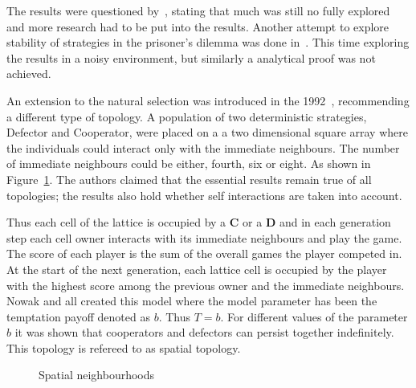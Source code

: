 \documentclass{article}
\begin{document}
The results were questioned by~\cite{May1987}, stating that much was
still no fully explored and more research had to be put into the results.
Another attempt to explore stability of strategies in the prisoner's dilemma
was done in~\cite{Boyd1989}. This time exploring the results in a noisy
environment, but similarly a analytical proof was not achieved.

An extension to the natural selection was introduced in the 1992~\cite{Nowak1992b},
recommending a different type of topology. A population of two deterministic
strategies, Defector and Cooperator, were placed on a a two dimensional square array
where the individuals could interact only with the immediate neighbours.
The number of immediate neighbours could be either, fourth, six or eight. As
shown in Figure~\ref{fig:topologies}. The authors claimed that the essential
results remain true of all topologies; the results also hold whether self interactions
are taken into account.

Thus each cell of the lattice is occupied by a \textbf{C} or a \textbf{D} and in
each generation step each cell owner interacts with its immediate neighbours and
play the game. The score of each player is the sum of the overall games the player
competed in. At the start of the next generation, each lattice cell is occupied by the
player with the highest score among the previous owner and the immediate
neighbours. Nowak and all created this model where the model parameter
has been the temptation payoff denoted as \(b\). Thus \(T=b\). For 
different values of the parameter \(b\) it was shown that cooperators and
defectors can persist together indefinitely. This topology is refereed to as
spatial topology.

\begin{figure}[!hbtp]
\centering
    \begin{subfigure}{.25\textwidth}
            
    \end{subfigure}
    \begin{subfigure}{.25\textwidth}\centering
         
     \end{subfigure}
     \begin{subfigure}{.25\textwidth}\centering
         
     \end{subfigure}
    \begin{subfigure}{.25\textwidth}
            
    \end{subfigure}
    \begin{subfigure}{.25\textwidth}\centering
         
     \end{subfigure}
     \begin{subfigure}{.25\textwidth}\centering
         
     \end{subfigure}
     \caption{Spatial neighbourhoods}\label{fig:topologies}
    \end{figure}
\end{document}
